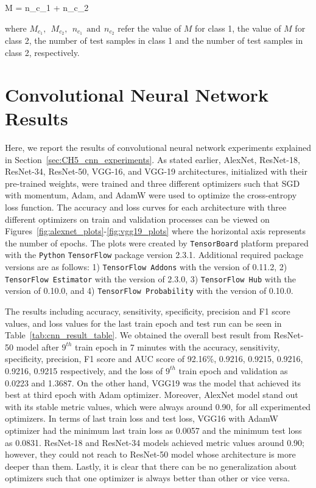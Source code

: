 \be
\label{eq:weighted_avg_binary_class_metric}
M =  {n_{c_{1}} + n_{c_{2}}} \:\: \raisepunct{,}
\ee

where $M_{c_{1}},\:\:M_{c_{2}},\:\:n_{c_{1}}\:\:\text{and}\:\:n_{c_{2}}$ refer the value of $M$ for class 1, the value of $M$ for class 2, the number of test samples in class 1 and the number of test samples in class 2, respectively.

\section{Convolutional Neural Network Results}

Here, we report the results of convolutional neural network experiments explained in Section~\ref{sec:CH5_cnn_experiments}. As stated earlier, AlexNet, ResNet-18, ResNet-34, ResNet-50, VGG-16, and VGG-19 architectures, initialized with their pre-trained weights, were trained and three different optimizers such that SGD with momentum, Adam, and AdamW were used to optimize the cross-entropy loss function. The accuracy and loss curves for each architecture with three different optimizers on train and validation processes can be viewed on Figures~\ref{fig:alexnet_plots}-\ref{fig:vgg19_plots} where the horizontal axis represents the number of epochs. The plots were created by \verb|TensorBoard| platform prepared with the \verb|Python| \verb|TensorFlow| package version 2.3.1. Additional required package versions are as follows: 1) \verb|TensorFlow Addons| with the version of 0.11.2, 2) \verb|TensorFlow Estimator| with the version of 2.3.0, 3) \verb|TensorFlow Hub| with the version of 0.10.0, and 4) \verb|TensorFlow Probability| with the version of 0.10.0.

The results including accuracy, sensitivity, specificity, precision and F1 score values, and loss values for the last train epoch and test run can be seen in Table~\ref{tab:cnn_result_table}. We obtained the overall best result from ResNet-50 model after $9^{th}$ train epoch in 7 minutes with the accuracy, sensitivity, specificity, precision, F1 score and AUC score of 92.16\%, 0.9216, 0.9215, 0.9216, 0.9216, 0.9215 respectively, and the loss of $9^{th}$ train epoch and validation as 0.0223 and 1.3687. On the other hand, VGG19 was the model that achieved its best at third epoch with Adam optimizer. Moreover, AlexNet model stand out with its stable metric values, which were always around 0.90, for all experimented optimizers. In terms of last train loss and test loss, VGG16 with AdamW optimizer had the minimum last train loss as 0.0057 and the minimum test loss as 0.0831. ResNet-18 and ResNet-34 models achieved metric values around 0.90; however, they could not reach to ResNet-50 model whose architecture is more deeper than them. Lastly, it is clear that there can be no generalization about optimizers such that one optimizer is always better than other or vice versa.

